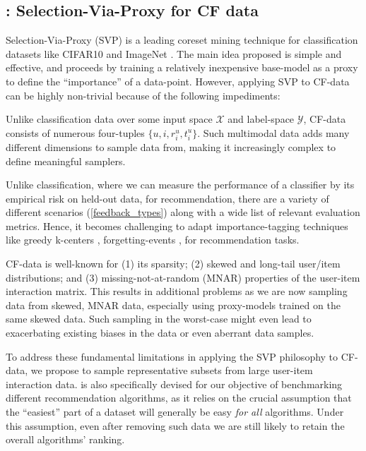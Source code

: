 \subsection{\sampler: Selection-Via-Proxy for CF data} \label{svp_cf} 
Selection-Via-Proxy (SVP) \cite{svp} is a leading coreset mining technique for classification datasets like CIFAR10 \cite{cifar} and ImageNet \cite{image_net}. The main idea proposed is simple and effective, and proceeds by training a relatively inexpensive base-model as a proxy to define the ``importance'' of a data-point. However, applying SVP to CF-data can be highly non-trivial because of the following impediments:
\begin{itemize}
     Unlike classification data 
    over some input space $\mathcal{X}$ and label-space $\mathcal{Y}$, CF-data consists of numerous four-tuples $\{u, i, r^u_i, t^u_i\}$. Such multimodal data adds many different dimensions to sample data from, making it increasingly complex to define meaningful samplers. 
    
     Unlike classification, where we can measure the performance of a classifier by 
    its
    empirical risk on held-out data, for recommendation, there are a variety of different scenarios (\cref{feedback_types}) along with a wide list of relevant evaluation metrics. Hence, it becomes challenging to adapt importance-tagging techniques like greedy k-centers \cite{k_centers}, forgetting-events \cite{forgetting_events}, \etc for recommendation tasks.
    
    CF-data is well-known for (1) 
    its
    sparsity; (2) skewed and long-tail user/item distributions; and (3) missing-not-at-random (MNAR) properties of the user-item interaction matrix. This results in additional problems as we are now sampling data from skewed, MNAR data, especially using proxy-models trained on the same skewed data. Such sampling in the worst-case might even lead to exacerbating existing biases in the data or even aberrant data samples.
\end{itemize}
To address these fundamental limitations in applying the SVP philosophy to CF-data, we propose \sampler to sample representative subsets from large user-item interaction data. \sampler is also specifically devised for our objective of benchmarking different recommendation algorithms, as it relies on the crucial assumption that the ``easiest'' part of a dataset will generally be easy \emph{for all} algorithms. Under this assumption, even after removing such data we are still likely to retain the overall algorithms' ranking.

